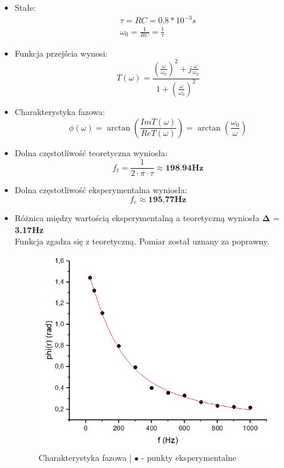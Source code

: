 \begin{itemize}
    \item Stałe:
    \begin{gather}
        \tau = RC = 0.8 * 10^{-3}s \\
        \omega_0 = \frac{1}{RC} = \frac{1}{\tau}
    \end{gather}
    \item Funkcja przejścia wynosi:
        \begin{equation}
            T(\omega) = \frac{(\frac{\omega}{\omega_0})^2 + j\frac{\omega}{\omega_0}}{1 + (\frac{\omega}{\omega_0})^2}
        \end{equation}
    \item Charakterystyka fazowa:
        \begin{equation}
            \phi(\omega) = \arctan({\frac{Im T(\omega)}{Re T(\omega)}}) = \arctan({\frac{\omega_0}{\omega}})
        \end{equation}
    \item Dolna częstotliwość teoretyczna wyniosła: 
        \begin{equation}
            f_t = \frac{1}{2\cdot\pi\cdot\tau} \approx \textbf{198.94Hz}
        \end{equation}
    \item Dolna częstotliwość eksperymentalna wyniosła:
        \begin{equation}
            f_e \approx \textbf{195,77Hz}
        \end{equation}
    \item Różnica między wartością eksperymentalną a teoretyczną wyniosła $\boldsymbol{\Delta}$ = \textbf{3.17Hz} \\
        Funkcja zgadza się z teoretyczną. Pomiar został uznany za poprawny.
    \begin{figure}[H]
        \centering
        \includegraphics[scale=0.6]{img_wykresy/fazowa_CR.png}
        \caption{Charakterystyka fazowa | $\bullet$ - punkty eksperymentalne}
        \label{fig:CR_amp}
    \end{figure}
\end{itemize}